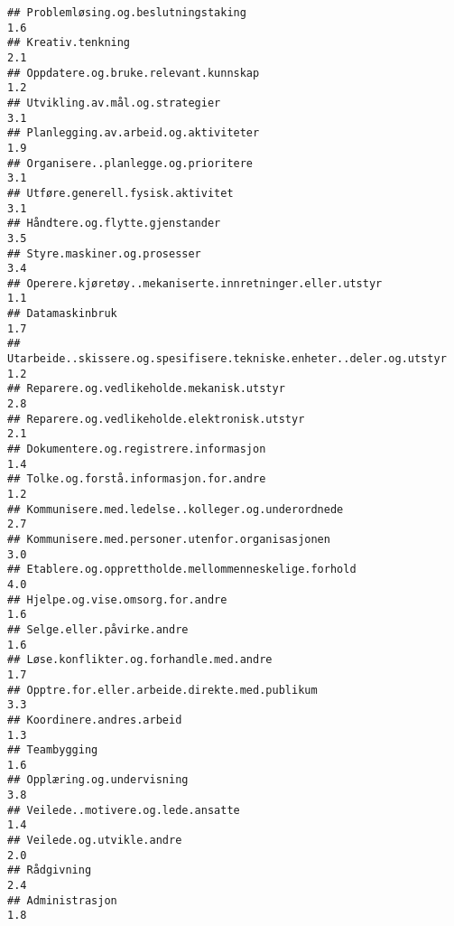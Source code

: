 \documentclass[
]{article}
\begin{document}
\begin{verbatim}
## Problemløsing.og.beslutningstaking                                               1.6
## Kreativ.tenkning                                                                 2.1
## Oppdatere.og.bruke.relevant.kunnskap                                             1.2
## Utvikling.av.mål.og.strategier                                                   3.1
## Planlegging.av.arbeid.og.aktiviteter                                             1.9
## Organisere..planlegge.og.prioritere                                              3.1
## Utføre.generell.fysisk.aktivitet                                                 3.1
## Håndtere.og.flytte.gjenstander                                                   3.5
## Styre.maskiner.og.prosesser                                                      3.4
## Operere.kjøretøy..mekaniserte.innretninger.eller.utstyr                          1.1
## Datamaskinbruk                                                                   1.7
## Utarbeide..skissere.og.spesifisere.tekniske.enheter..deler.og.utstyr             1.2
## Reparere.og.vedlikeholde.mekanisk.utstyr                                         2.8
## Reparere.og.vedlikeholde.elektronisk.utstyr                                      2.1
## Dokumentere.og.registrere.informasjon                                            1.4
## Tolke.og.forstå.informasjon.for.andre                                            1.2
## Kommunisere.med.ledelse..kolleger.og.underordnede                                2.7
## Kommunisere.med.personer.utenfor.organisasjonen                                  3.0
## Etablere.og.opprettholde.mellommenneskelige.forhold                              4.0
## Hjelpe.og.vise.omsorg.for.andre                                                  1.6
## Selge.eller.påvirke.andre                                                        1.6
## Løse.konflikter.og.forhandle.med.andre                                           1.7
## Opptre.for.eller.arbeide.direkte.med.publikum                                    3.3
## Koordinere.andres.arbeid                                                         1.3
## Teambygging                                                                      1.6
## Opplæring.og.undervisning                                                        3.8
## Veilede..motivere.og.lede.ansatte                                                1.4
## Veilede.og.utvikle.andre                                                         2.0
## Rådgivning                                                                       2.4
## Administrasjon                                                                   1.8

\end{verbatim}
\end{document}
